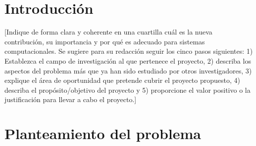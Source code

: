 \documentclass[final,12pt]{article}
\begin{document}
\clearpage



\clearpage
\clearpage

\clearpage




\section*{Introducción}

[Indique de forma clara y coherente en una cuartilla cuál es la nueva contribución, su importancia y por qué es adecuado para sistemas computacionales. Se sugiere para su redacción seguir los cinco pasos siguientes: 1) Establezca el campo de investigación al que pertenece el proyecto, 2) describa los aspectos del problema más que ya han sido estudiado por otros investigadores, 3) explique el área de oportunidad que pretende cubrir el proyecto propuesto, 4) describa el propósito/objetivo del proyecto y 5) proporcione el valor positivo o la justificación para llevar a cabo el proyecto.] 
\newpage


\section{Planteamiento del problema}

\end{document}
